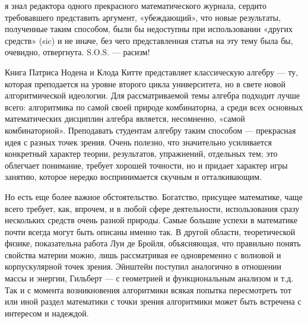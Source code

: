 {{\pagebreak
\noindent
я знал редактора одного прекрасного математического журнала, сердито требовавшего представить аргумент, «убеждающий», что новые результаты, полученные таким способом, были бы недоступны при использовании «других средств» (sic) и не иначе, без чего представленная статья на эту тему была бы, очевидно, отвергнута. S.O.S. — расизм!

   Книга Патриса Нодена и Клода Китте представляет классическую алгебру — ту, которая преподается на уровне второго цикла университета, но в свете новой алгоритмической идеологии. Для рассматриваемой темы алгебра подходит лучше всего: алгоритмика по самой своей природе комбинаторна, а среди всех основных математических дисциплин алгебра является, несомненно, «самой комбинаторной». Преподавать студентам алгебру таким способом — прекрасная идея с разных точек зрения. Очень полезно, что значительно усиливается конкретный характер теории, результатов, упражнений, отдельных тем; это облегчает понимание, требует хорошей точности, но и придает характер игры занятию, которое нередко воспринимается скучным и отталкивающим.

   Но есть еще более важное обстоятельство. Богатство, присущее математике, чаще всего требует, как, впрочем, и в любой сфере деятельности, использования сразу нескольких средств очень разной природы. Самые большие успехи в математике почти всегда могут быть описаны именно так. В другой области, теоретической физике, показательна работа Луи де Бройля, объясняющая, что правильно понять свойства материи можно, лишь рассматривая ее одновременно с волновой и корпускулярной точек зрения. Эйнштейн поступил аналогично в отношении массы и энергии, Гильберт — с геометрией и функциональным анализом и т.д. Так и с момента возникновения алгоритмики всякая попытка пересмотреть тот или иной раздел математики с точки зрения алгоритмики может быть встречена с интересом и надеждой.

}}

